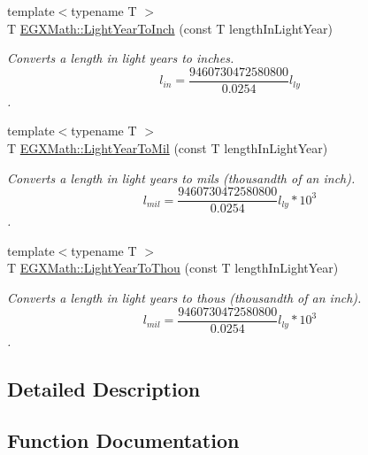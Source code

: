 \begin{DoxyCompactItemize}
{\footnotesize template$<$typename T $>$ }\\T \mbox{\hyperlink{group___e_g_x_math-_conversions-_length_conversions-_astronomical-_light_year-_imperial_gafb89ce302210990623906b463d6e50cb}{E\+G\+X\+Math\+::\+Light\+Year\+To\+Inch}} (const T length\+In\+Light\+Year)
\begin{DoxyCompactList}\small\item\em Converts a length in light years to inches. \[ l_{in}= \frac{9460730472580800}{0.0254} l_{ly} \]. \end{DoxyCompactList}\item 
{\footnotesize template$<$typename T $>$ }\\T \mbox{\hyperlink{group___e_g_x_math-_conversions-_length_conversions-_astronomical-_light_year-_imperial_ga980a3d37f73ebc5f217366ee01e7b4ae}{E\+G\+X\+Math\+::\+Light\+Year\+To\+Mil}} (const T length\+In\+Light\+Year)
\begin{DoxyCompactList}\small\item\em Converts a length in light years to mils (thousandth of an inch). \[ l_{mil}= \frac{9460730472580800}{0.0254} l_{ly} * 10^{3} \]. \end{DoxyCompactList}\item 
{\footnotesize template$<$typename T $>$ }\\T \mbox{\hyperlink{group___e_g_x_math-_conversions-_length_conversions-_astronomical-_light_year-_imperial_ga84d83b078dfeb11c1cdaca84b4f988cb}{E\+G\+X\+Math\+::\+Light\+Year\+To\+Thou}} (const T length\+In\+Light\+Year)
\begin{DoxyCompactList}\small\item\em Converts a length in light years to thous (thousandth of an inch). \[ l_{mil}= \frac{9460730472580800}{0.0254} l_{ly} * 10^{3} \]. \end{DoxyCompactList}\end{DoxyCompactItemize}


\subsection{Detailed Description}


\subsection{Function Documentation}
\mbox{\label{group___e_g_x_math-_conversions-_length_conversions-_astronomical-_light_year-_imperial_gac1d171820f3a01eac5bcb514932a3a17}} 
